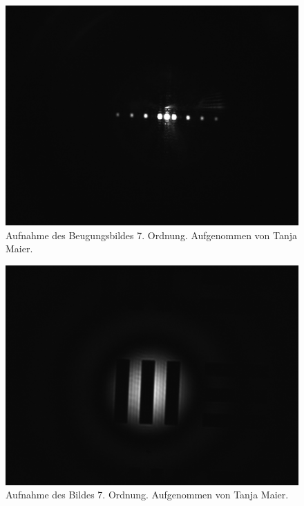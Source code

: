 \documentclass{article}
\begin{document}
\begin{minipage}[t]{.45\textwidth}
\begin{figure}[H]
\includegraphics[scale=0.1]{tm/Beugungsbild_7.jpg}
\caption{Aufnahme des Beugungsbildes 7. Ordnung. Aufgenommen von Tanja Maier.}
\label{fig:bbild_7_tm}
\end{figure}
\end{minipage}
\hfill
\noindent
\begin{minipage}[t]{.45\textwidth}
\begin{figure}[H]
\includegraphics[scale=0.1]{tm/Bild_7.jpg}
\caption{Aufnahme des Bildes 7. Ordnung. Aufgenommen von Tanja Maier.}\label{fig:bild_7_tm}
\end{figure}
\end{minipage}
\end{document}
